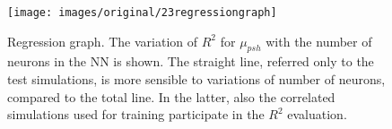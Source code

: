 \begin{figure}[!h] 
\centering 
\texttt{[image: images/original/23regressiongraph]}
\caption[Regression graph]{Regression graph. The variation of $R^2$ for
$\mu_{psh}$ with the number of neurons in the NN is shown. The
straight line, referred only to the test simulations, is more sensible to
variations of number of neurons, compared
to the total line. In the latter, also the correlated simulations used for
training participate in the $R^2$ evaluation.}
\label{fig:23regressiongraph} 
\end{figure}

